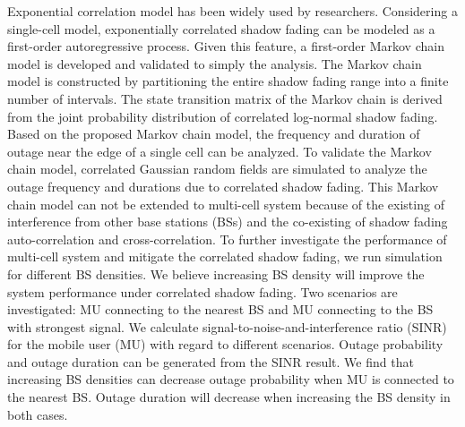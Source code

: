 \par Exponential correlation model \cite{gudmundson1991correlation} has been widely used by researchers. Considering a single-cell model, exponentially correlated shadow fading can be modeled as a first-order autoregressive process. Given this feature, a first-order Markov chain model is developed and validated  to simply the analysis. The Markov chain model is constructed by partitioning the entire shadow fading range into a finite number of intervals. The state transition matrix of the Markov chain is derived from the joint probability distribution of correlated log-normal shadow fading. Based on the proposed Markov chain model, the frequency and duration of outage near the edge of a single cell can be analyzed. To validate the Markov chain model, correlated Gaussian random fields are simulated to analyze the outage frequency and durations due to correlated shadow fading. 
This Markov chain model can not be extended to multi-cell system because of the existing of interference from other base stations (BSs) and the co-existing of shadow fading auto-correlation and cross-correlation. To further investigate the performance of multi-cell system and mitigate the correlated shadow fading, we run simulation for different BS densities. We believe increasing BS density will improve the system performance under correlated shadow fading. Two scenarios are investigated: MU connecting to the nearest BS and MU connecting to the BS with strongest signal. We calculate signal-to-noise-and-interference ratio (SINR) for the mobile user (MU) with regard to different scenarios. Outage probability and outage duration can be generated from the SINR result. We find that increasing BS densities can decrease outage probability when MU is connected to the nearest BS. Outage duration will decrease when increasing the BS density in both cases. 

